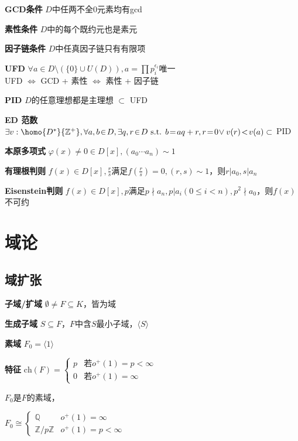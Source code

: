 \documentclass[a4paper,10pt]{ctexart}
\newcommand*{\setZ}{\mathbb{Z}}
\newcommand*{\setQ}{\mathbb{Q}}
\newcommand*{\st}{\text{ s.t. }}
\renewcommand*{\iff}{\Leftrightarrow}
\renewcommand*{\leq}{\leqslant}
\newcommand*{\genfield}[1]{\langle #1 \rangle}
\newcommand*{\ch}[1]{\text{ch}(#1)}
\begin{document}
\begin{multicols}{3}
    \textbf{GCD条件} $D$中任两不全0元素均有gcd

    \textbf{素性条件} $D$中的每个既约元也是素元

    \textbf{因子链条件} $D$中任真因子链只有有限项

    \textbf{UFD} $\forall a \!\in\! D \setminus (\{ 0 \} \!\cup\! U(D)), a \! = \! \prod p_i^{\epsilon_i}$唯一\\
    UFD $\iff$ GCD + 素性 $\iff$ 素性 + 因子链

    \textbf{PID} $D$的任意理想都是主理想 $\subset$ UFD

    \textbf{ED 范数} $\exists v: \homo{D^*}{\setZ^+}, \forall a, b \!\in\! D, \exists q, r \!\in\! D \st b \! = \! aq + r, r \! = \! 0 \!\vee v(r) \!<\! v(a) \subset$ PID

    \textbf{本原多项式} $\varphi(x) \!\ne\! 0 \!\in\! D[x], (a_0 \cdots a_n) \sim 1$

    \textbf{有理根判则} $f(x) \in D[x], \frac{r}{s}$满足$f(\frac{r}{s}) = 0, (r, s) \sim 1$，则$r | a_0, s | a_n$

    \textbf{Eisenstein判则} $f(x) \!\in\! D[x], p$满足$p \!\nmid\! a_n, p | a_i (0 \!\leq\! i \!<\! n), p^2 \nmid a_0$，则$f(x)$不可约

    \section{域论}

    \subsection{域扩张}

    \textbf{子域/扩域} $\emptyset \ne F \subseteq K$，皆为域

    \textbf{生成子域} $S \subseteq F$，$F$中含$S$最小子域，$\genfield{S}$

    \textbf{素域} $F_0 = \genfield{1}$

    \textbf{特征} $\ch{F} = \begin{cases}
            p & \text{若}o^+(1) = p < \infty \\
            0 & \text{若}o^+(1) = \infty
        \end{cases}$

    \begin{theorem}[素域同构]
        $F_0$是$F$的素域，

        $F_0 \cong \begin{cases}
                \setQ        & o^+(1) = \infty     \\
                \setZ/p\setZ & o^+(1) = p < \infty
            \end{cases}$
    \end{theorem}


\end{multicols}
\end{document}
